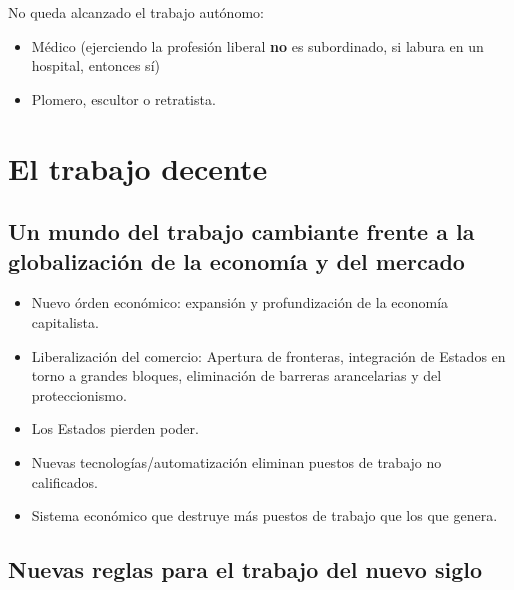 \documentclass[spanish,12pt,a4paper,titlepage]{report}
\begin{document}
No queda alcanzado el trabajo autónomo:
\begin{itemize}
\item Médico (ejerciendo la profesión liberal \textbf{no} es subordinado, si labura en un hospital, entonces sí)
\item Plomero, escultor o retratista.
\end{itemize}

\section{El trabajo decente}
\label{sec:el-trabajo-decente}

\subsection{Un mundo del trabajo cambiante frente a la globalización de la economía y del mercado}
\label{sec:Un-mundo-del-trabajo-cambiante-frente-a-la-globalizacion-de-la-economia-y-del-mercado}

\begin{itemize}
\item Nuevo órden económico: expansión y profundización de la economía capitalista.
\item Liberalización del comercio: Apertura de fronteras, integración de Estados en torno a grandes bloques, eliminación de barreras arancelarias y del proteccionismo.
\item Los Estados pierden poder.
\item Nuevas tecnologías/automatización eliminan puestos de trabajo no calificados.
\item Sistema económico que destruye más puestos de trabajo que los que genera.
\end{itemize}

\subsection{Nuevas reglas para el trabajo del nuevo siglo}
\label{sec:Nuevas-reglas-para-el-trabajo-del-nuevo-siglo}
\end{document}
